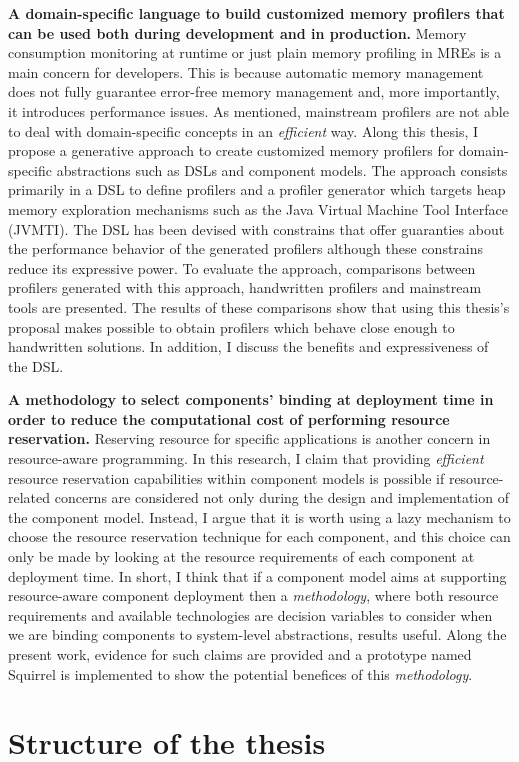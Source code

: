 \textbf{A domain-specific language to build customized memory profilers that can be used both during development and in production.}
Memory consumption monitoring at runtime or just plain memory profiling in MREs is a main concern for developers.
This is because automatic memory management does not fully guarantee error-free memory management and, more importantly, it introduces performance issues.
As mentioned, mainstream profilers are not able to deal with domain-specific concepts in an \textit{efficient} way.
Along this thesis, I propose a generative approach to create customized memory profilers for domain-specific abstractions such as DSLs and component models.
The approach consists primarily in a DSL to define profilers and a profiler generator which targets heap memory exploration mechanisms such as the Java Virtual Machine Tool Interface (JVMTI).
The DSL has been devised with constrains that offer guaranties about the performance behavior of the generated profilers although these constrains reduce its expressive power.
To evaluate the approach, comparisons between profilers generated with this approach, handwritten profilers and mainstream tools are presented.
The results of these comparisons show that using this thesis's proposal makes possible to obtain profilers which behave close enough to handwritten solutions.
In addition, I discuss the benefits and expressiveness of the DSL.

\textbf{A methodology to select components' binding at deployment time in order to reduce the computational cost of performing resource reservation.}
Reserving resource for specific applications is another concern in resource-aware programming.
In this research, I claim that providing \textit{efficient} resource reservation capabilities within component models is possible if resource-related concerns are considered not only during the design and implementation of the component model.
Instead, I argue that it is worth using a lazy mechanism to choose the resource reservation technique for each component, and this choice can only be made by looking at the resource requirements of each component at deployment time.
In short, I think that if a component model aims at supporting resource-aware component deployment then a \textit{methodology}, where both resource requirements and available technologies are decision variables to consider when we are binding components to system-level abstractions, results useful.
Along the present work, evidence for such claims are provided and a prototype named Squirrel is implemented to show the potential benefices of this \textit{methodology}.

\section{Structure of the thesis}